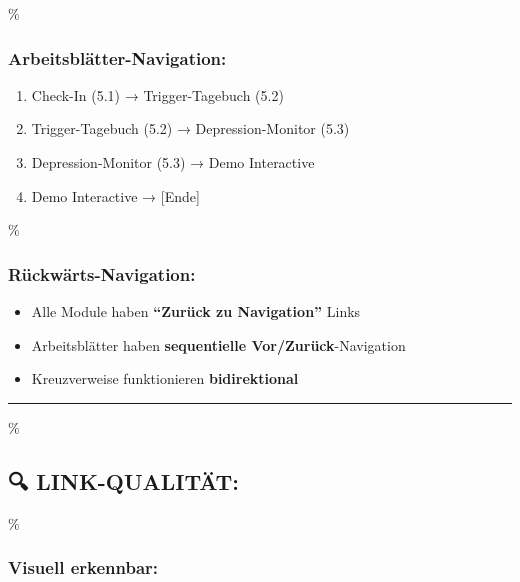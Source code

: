 \hypertarget{arbeitsbluxe4tter-navigation}{\%
\subsubsection{\texorpdfstring{\textbf{Arbeitsblätter-Navigation:}}{Arbeitsblätter-Navigation:}}\label{arbeitsbluxe4tter-navigation}}

\begin{enumerate}
\def\labelenumi{\arabic{enumi}.}
\tightlist
\item
  Check-In (5.1) → Trigger-Tagebuch (5.2)
\item
  Trigger-Tagebuch (5.2) → Depression-Monitor (5.3)
\item
  Depression-Monitor (5.3) → Demo Interactive
\item
  Demo Interactive → {[}Ende{]}
\end{enumerate}

\hypertarget{ruxfcckwuxe4rts-navigation}{\%
\subsubsection{\texorpdfstring{\textbf{Rückwärts-Navigation:}}{Rückwärts-Navigation:}}\label{ruxfcckwuxe4rts-navigation}}

\begin{itemize}
\tightlist
\item
  Alle Module haben \textbf{``Zurück zu Navigation''} Links
\item
  Arbeitsblätter haben \textbf{sequentielle Vor/Zurück}-Navigation
\item
  Kreuzverweise funktionieren \textbf{bidirektional}
\end{itemize}

\begin{center}\rule{0.5\linewidth}{0.5pt}\end{center}

\hypertarget{link-qualituxe4t}{\%
\subsection{\texorpdfstring{🔍 \textbf{LINK-QUALITÄT:}}{🔍 LINK-QUALITÄT:}}\label{link-qualituxe4t}}

\hypertarget{visuell-erkennbar}{\%
\subsubsection{\texorpdfstring{\textbf{Visuell erkennbar:}}{Visuell erkennbar:}}\label{visuell-erkennbar}}

